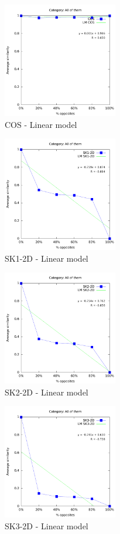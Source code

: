 \documentclass[a4paper,10pt]{article}
\begin{document}
\begin{figure}[ht]{\centering
\includegraphics[height=5cm]{allcat_COS_LM.pdf}
\caption{COS - Linear model}
}\end{figure}
\begin{figure}[ht]{\centering
\includegraphics[height=5cm]{allcat_SK1-2D_LM.pdf}
\caption{SK1-2D - Linear model}
}\end{figure}
\begin{figure}[ht]{\centering
\includegraphics[height=5cm]{allcat_SK2-2D_LM.pdf}
\caption{SK2-2D - Linear model}
}\end{figure}
\begin{figure}[ht]{\centering
\includegraphics[height=5cm]{allcat_SK3-2D_LM.pdf}
\caption{SK3-2D - Linear model}
}\end{figure}
\end{document}
